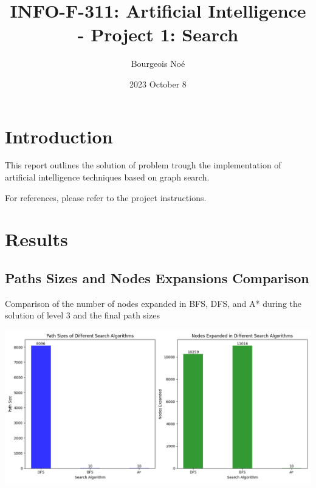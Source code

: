 \documentclass{article}
\title{INFO-F-311: Artificial Intelligence - Project 1: Search}
\author{Bourgeois Noé}
\date{2023 October 8}
\begin{document}
\maketitle

\tableofcontents

\newpage
\section{Introduction}
This report outlines the solution of problem trough 
the implementation of artificial intelligence techniques 
based on graph search.

For references, please refer to the project instructions.

\section{Results}
\subsection{Paths Sizes and Nodes Expansions Comparison}
Comparison of the number of nodes expanded in BFS, DFS, and A* during the solution of level 3 and the final path sizes

\includegraphics[width=\textwidth]{media/Figure_1.png}


\end{document}
